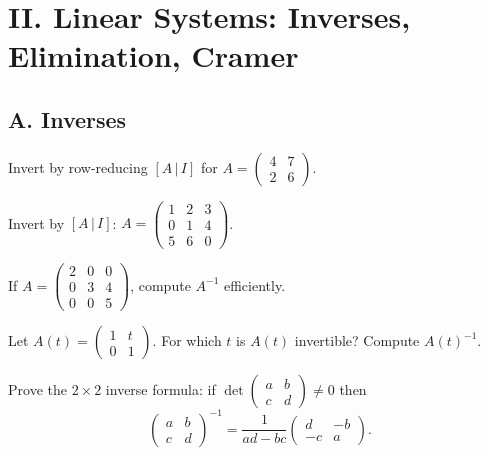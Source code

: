 \documentclass[11pt]{article}
\begin{document}
\section*{II. Linear Systems: Inverses, Elimination, Cramer}

\subsection*{A. Inverses}
\begin{problem}
Invert by row-reducing $[A\,|\,I]$ for $A=\begin{pmatrix}4&7\\2&6\end{pmatrix}$.
\end{problem}

\begin{problem}
Invert by $[A\,|\,I]$:
$A=\begin{pmatrix}1&2&3\\0&1&4\\5&6&0\end{pmatrix}$.
\end{problem}

\begin{problem}
If $A=\begin{pmatrix}2&0&0\\0&3&4\\0&0&5\end{pmatrix}$, compute $A^{-1}$ efficiently.
\end{problem}

\begin{problem}
Let $A(t)=\begin{pmatrix}1&t\\0&1\end{pmatrix}$. For which $t$ is $A(t)$ invertible? Compute $A(t)^{-1}$.
\end{problem}

\begin{problem}
Prove the $2\times 2$ inverse formula: if $\det\begin{pmatrix}a&b\\ c&d\end{pmatrix}\neq 0$ then
\[
\begin{pmatrix}a&b\\ c&d\end{pmatrix}^{-1}
=\frac{1}{ad-bc}\begin{pmatrix} d&-b\\ -c&a\end{pmatrix}.
\]
\end{problem}
\end{document}
